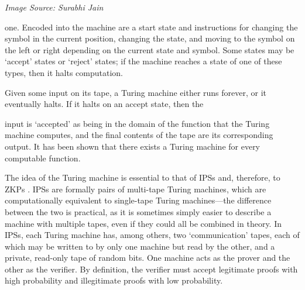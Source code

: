 \documentclass{article}
\begin{document}
\begin{adjustwidth}{0.5in}{0in}
\begin{multicols}{2}
 \vspace{0.05in}
\noindent \begin{center} \textit{\small Image Source: Surabhi Jain} \end{center}

\noindent one. Encoded into the machine are a start state and instructions for changing the symbol in the current position, changing the state, and moving to the symbol on the left or right depending on the current state and symbol. Some states may be `accept' states or `reject' states; if the machine reaches a state of one of these types, then it halts computation.

Given some input on its tape, a Turing machine either runs forever, or it eventually halts. If it halts on an accept state, then the 
\end{multicols} \vspace{-0.15in}

\noindent input is `accepted' as being in the domain of the function that the Turing machine computes, and the final contents of the tape are its corresponding output. It has been shown that there exists a Turing machine for every computable function.
\end{adjustwidth} \vspace{0.15in}

The idea of the Turing machine is essential to that of IPSs and, therefore, to ZKPs \cite{GMR}. IPSs are formally pairs of multi-tape Turing machines, which are computationally equivalent to single-tape Turing machines---the difference between the two is practical, as it is sometimes simply easier to describe a machine with multiple tapes, even if they could all be combined in theory. In IPSs, each Turing machine has, among others, two `communication' tapes, each of which may be written to by only one machine but read by the other, and a private, read-only tape of random bits. One machine acts as the prover and the other as the verifier. By definition, the verifier must accept legitimate proofs with high probability and illegitimate proofs with low probability.
\end{document}
